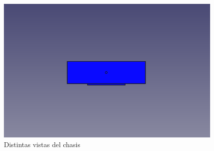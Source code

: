 \begin{figure}[ht!]
\begin{minipage}{0.45\linewidth}
		\caption*{\centering} %
	\end{minipage}
	\hspace{1cm}
	\begin{minipage}{0.45\linewidth}
		\centering
		\includegraphics[width=\linewidth]{figs/cap5/basetraserasin.png}
		\caption*{\centering} %
	\end{minipage}

	\caption{Distintas vistas del chasis}
	\label{fig:pbase}
\end{figure}



